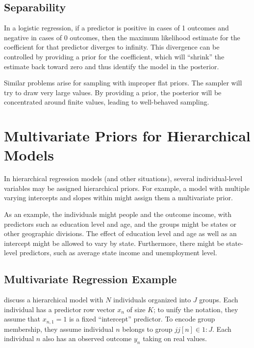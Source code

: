 \subsection{Separability}

In a logistic regression, if a predictor is positive in cases of 1
outcomes and negative in cases of 0 outcomes, then the maximum
likelihood estimate for the coefficient for that predictor diverges to
infinity.  This divergence can be controlled by providing a prior for
the coefficient, which will ``shrink'' the estimate back toward zero
and thus identify the model in the posterior.  

Similar problems arise for sampling with improper flat priors.  The
sampler will try to draw very large values.  By providing a prior,
the posterior will be concentrated around finite values, leading to
well-behaved sampling.



\section{Multivariate Priors for Hierarchical Models}\label{multivariate-hierarchical-priors.section}

In hierarchical regression models (and other situations), several
individual-level variables may be assigned hierarchical priors.  For
example, a model with multiple varying intercepts and slopes within
might assign them a multivariate prior. 

As an example, the individuals might people and the outcome income,
with predictors such as education level and age, and the groups might be states
or other geographic divisions.  The effect of education level and age
as well as an intercept might be allowed to vary by state.
Furthermore, there might be state-level predictors, such as average
state income and unemployment level.

\subsection{Multivariate Regression Example}

\cite[Chapter 13, Chapter 17]{GelmanHill:2007} discuss a hierarchical
model with $N$ individuals organized into $J$ groups.  Each individual
has a predictor row vector $x_n$ of size $K$; to unify the notation, they
assume that $x_{n,1} = 1$ is a fixed ``intercept'' predictor.  To
encode group membership, they assume individual $n$ belongs to group
$jj[n] \in 1{:}J$.  Each individual $n$ also has an observed outcome
$y_n$ taking on real values. 

